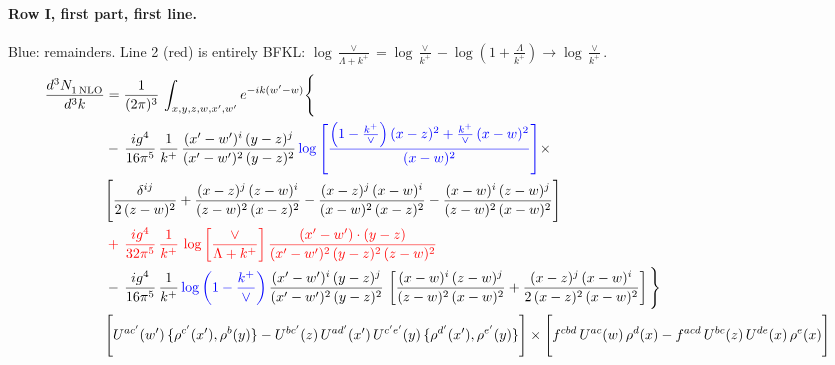 \documentclass[10pt]{article}
\numberwithin{equation}{section}
\newcommand{\new}[1]{{\color{blue}#1}}
\newcommand{\old}[1]{{\color{red}#1}}
\newcommand{\rc}{\color{red}}
\begin{document}
\paragraph{Row I, first part, first line.}
\new{Blue}: remainders. Line 2 (\old{red}) is entirely BFKL: $\log\frac{\vee}{\Lambda+k^+}=\log\frac{\vee}{k^+}-\log(1+\frac{\Lambda}{k^+})\to\log\frac{\vee}{k^+}$.
\begin{align}
 \frac{d^{3}N_{1\,\rm NLO}^{\rm}}{d^{3}k}  & =     \frac{1}{(2\pi)^{3}}\,\int_{x,y,z,w,x',w^{\prime}} e^{-ik(w^{\prime}-w)}\Bigg\{\notag \\
& -\, \frac{ig^{4}}{16\pi^{5}}\,\frac{1}{k^{+}}\, \frac{(x'-w')^{i}\,(y-z)^{j}}{(x'-w')^{2}\,(y-z)^{2}}\,\new{\log{\left[\frac{\left(1-\frac{k^{+}}{\vee}\right)(x-z)^{2}+\frac{k^{+}}{\vee}\,(x-w)^{2}}{(x-w)^{2}}\right]}}\times\notag \\ &  \Bigg[\frac{\delta^{ij}}{2\,(z-w)^{2}}+\frac{(x-z)^{j}\,(z-w)^{i}}{(z-w)^{2}\,(x-z)^{2}}-\frac{(x-z)^{j}\,(x-w)^{i}}{(x-w)^{2}\,(x-z)^{2}}-\frac{(x-w)^{i}\,(z-w)^{j}}{(z-w)^{2}\,(x-w)^{2}}\Bigg] \notag \\
& \rc  +\,\frac{ig^{4}}{32\pi^{5}}\,\frac{1}{k^{+}}\,\log{\left[\frac{\vee}{\Lambda + k^{+}}\right]}\, \frac{(x'-w')\cdot (y-z)}{(x'-w')^{2}\,(y-z)^{2}\,(z-w)^{2}} \notag \\
& -\, \frac{ig^{4}}{16\pi^{5}}\,\frac{1}{k^{+}}\,\new{\log{\left(1-\frac{k^{+}}{\vee}\right)}}\,\frac{(x'-w')^{i}\,(y-z)^{j}}{(x'-w')^{2}\,(y-z)^{2}}\,\left[\frac{(x-w)^{i}\,(z-w)^{j}}{(z-w)^{2}\,(x-w)^{2}}+\frac{(x-z)^{j}\,(x-w)^{i}}{2\,(x-z)^{2}\, (x-w)^{2}}\right]\Bigg\} \notag \\ & \Bigg[U^{ac'}(w')\,\{\rho^{c'}(x'),\rho^{b}(y)\}-U^{bc'}(z)\,U^{ad'}(x')\,U^{c'e'}(y)\, \{\rho^{d'}(x'),\rho^{e'}(y)\}\Bigg]\times \Bigg[f^{cbd}\,U^{ac}(w)\,\rho^{d}(x)-f^{acd}\, U^{bc}(z)\,U^{de}(x)\,\rho^{e}(x)\Bigg]\notag \\ \label{eq:F:G2I1A}
\end{align}
\end{document}
